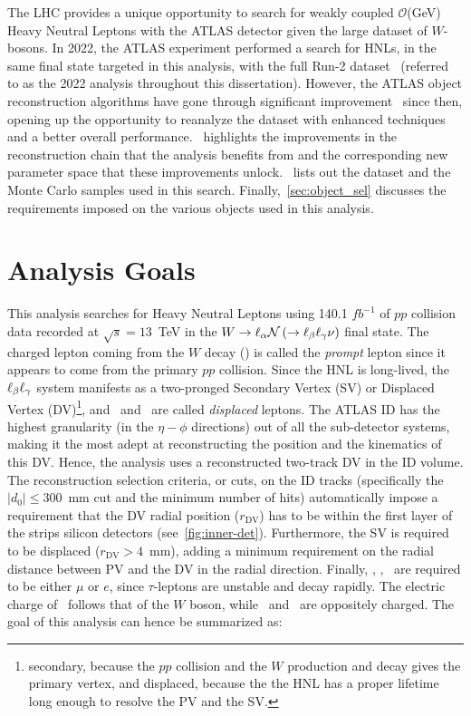 The LHC provides a unique opportunity to search for weakly coupled $\mathcal{O}$(GeV) Heavy Neutral Leptons with the ATLAS detector given the large dataset of $W$-bosons. In 2022, the ATLAS experiment performed a search for HNLs, in the same final state targeted in this analysis, with the full Run-2 dataset~\cite{PhysRevLett.131.061803} (referred to as the 2022 analysis throughout this dissertation). However, the ATLAS object reconstruction algorithms have gone through significant improvement~\cite{atlascollaboration2023software} since then, opening up the opportunity to reanalyze the dataset with enhanced techniques and a better overall performance.~ highlights the improvements in the reconstruction chain that the analysis benefits from and the corresponding new parameter space that these improvements unlock.~ lists out the dataset and the Monte Carlo samples used in this search. Finally,~\cref{sec:object_sel} discusses the requirements imposed on the various objects used in this analysis.


\section{Analysis Goals}\label{sec:ana_goals}

This analysis searches for Heavy Neutral Leptons using 140.1 $fb^{-1}$ of $pp$ collision data recorded at $\sqrt{s}=13$~TeV in the $W\rightarrow \ell_\alpha \mathcal{N}\left(\rightarrow\ell_\beta\ell_\gamma\nu \right)$ final state. The charged lepton coming from the $W$ decay (\ela) is called the \textit{prompt} lepton since it appears to come from the primary $pp$ collision. Since the HNL is long-lived, the $\ell_\beta\ell_\gamma$ system manifests as a two-pronged Secondary Vertex (SV) or Displaced Vertex (DV)\footnote{secondary, because the $pp$ collision and the $W$ production and decay gives the primary vertex, and displaced, because the the HNL has a proper lifetime long enough to resolve the PV and the SV.}, and \elb~and \elg~are called \textit{displaced} leptons. The ATLAS ID has the highest granularity (in the $\eta-\phi$ directions) out of all the sub-detector systems, making it the most adept at reconstructing the position and the kinematics of this DV. Hence, the analysis uses a reconstructed two-track DV in the ID volume. The reconstruction selection criteria, or cuts, on the ID tracks (specifically the $|d_0|\leq 300$~mm cut and the minimum number of hits) automatically impose a requirement that the DV radial position ($r_\mathrm{DV}$) has to be within the first layer of the strips silicon detectors (see~\cref{fig:inner-det}). Furthermore, the SV is required to be displaced ($r_\mathrm{DV}>4$~mm), adding a minimum requirement on the radial distance between PV and the DV in the radial direction. Finally, \ela, \elb, \elg~are required to be either $\mu$ or $e$, since $\tau$-leptons are unstable and decay rapidly. The electric charge of \ela~follows that of the $W$ boson, while \elb~and \elg~are oppositely charged. The goal of this analysis can hence be summarized as:


